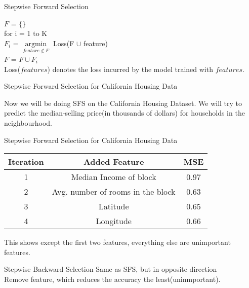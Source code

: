 \documentclass{beamer}
\newcommand{\argminF}{\mathop{\mathrm{argmin}}\limits}   %
\begin{document}
\begin{frame}{Stepwise Forward Selection}

    $F$ = $\{\}$\\
    for i = 1 to K\\
    \vspace{1em}
    \hspace{2em} $F_{i}$  = $\argminF_{feature \notin F} $ Loss(F $\cup$ feature)\\
    \vspace{1em}
    \hspace{2em} $F$ = $F \cup F_{i}$ \\
        
\vspace{2em}
Loss($features$) denotes the loss incurred by the model trained with $features$.
\end{frame}



\begin{frame}{Stepwise Forward Selection for California Housing Data }

	Now we will be doing SFS on the California Housing Dataset. We will try to predict the median-selling price(in thousands of dollars) for households in the neighbourhood.
	
\end{frame}

\begin{frame}{Stepwise Forward Selection for California Housing Data }
\begin{center}

	\begin{tabular}{|c|c|c|}
	\hline
	\textbf{Iteration}&	\textbf{Added Feature}	&\textbf{MSE}\\
	\hline
	\hline
	1&Median Income of block&0.97\\
	2&Avg. number  of rooms in the block&0.63\\
	3&Latitude&0.65\\
	4&Longitude&0.66\\
	\hline
	
	
	\end{tabular}


\end{center}

	This shows except the first two features, everything else are unimportant features.
\end{frame}

\begin{frame}{Stepwise Backward Selection}
    Same as SFS, but in opposite direction\\
    Remove feature, which reduces the accuracy the least(uninmportant).
\end{frame}
\end{document}
